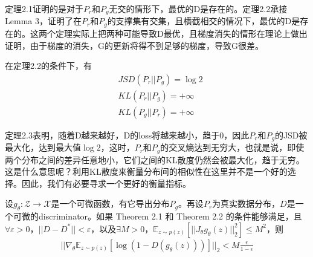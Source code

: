             \par
            定理2.1证明的是对于$P_r$和$P_g$无交的情形下，最优的D是存在的。定理2.2承接Lemma 3，证明了在$P_r$和$P_g$的支撑集有交集，且横截相交的情况下，最优的D是存在的。这两个定理实际上把两种可能导致D最优，且梯度消失的情形在理论上做出证明，由于梯度的消失，G的更新将得不到足够的梯度，导致G很差。
            \begin{theorem}[Theorem2.3]
            在定理2.2的条件下，有
            \begin{align*}
            & JSD(P_r||P_g) = \log 2\\
            & KL(P_r||P_g) = +\infty\\
            & KL(P_g||P_r) = +\infty
            \end{align*}
            \end{theorem}
            \par
            定理2.3表明，随着D越来越好，D的loss将越来越小，趋于0，因此$P_r$和$P_g$的JSD被最大化，达到最大值$\log2$，这时，$P_r$和$P_g$的交叉熵达到无穷大，也就是说，即使两个分布之间的差异任意地小，它们之间的KL散度仍然会被最大化，趋于无穷。这是什么意思呢？利用KL散度来衡量分布间的相似性在这里并不是一个好的选择。因此，我们有必要寻求一个更好的衡量指标。
            \begin{theorem}
            设$g_\theta:\mathcal{Z}\to \mathcal{X}$是一个可微函数，有它导出分布$P_g$。再设$P_r$为真实数据分布，$D$是一个可微的discriminator。如果 Theorem 2.1 和 Theorem 2.2 的条件能够满足，且$\forall \varepsilon>0 $，$||D-D^*||<\varepsilon$，以及$\exists M>0$，$\mathbb{E}_{z\sim p(z)}\left[||J_\theta g_\theta(z)||_2^2\right] \leqslant M^2$，则
            \begin{align*}
            ||\nabla_\theta \mathbb{E}_{z\sim p(z)}\left[\log(1-D(g_\theta(z)))\right]||_2 <M\frac{\epsilon}{1-\epsilon}
            \end{align*}
            \end{theorem}
